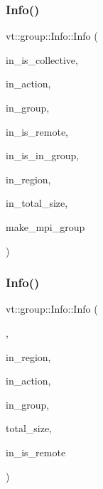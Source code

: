 \subsubsection{\texorpdfstring{Info()}{Info()}\hspace{0.1cm}{\footnotesize\ttfamily [1/5]}}
{\footnotesize\ttfamily vt\+::group\+::\+Info\+::\+Info (\begin{DoxyParamCaption}\item[{bool const \&}]{in\+\_\+is\+\_\+collective,  }\item[{\hyperlink{namespacevt_ae0a5a7b18cc99d7b732cb4d44f46b0f3}{Action\+Type}}]{in\+\_\+action,  }\item[{\hyperlink{namespacevt_a27b5e4411c9b6140c49100e050e2f743}{Group\+Type} const}]{in\+\_\+group,  }\item[{bool const \&}]{in\+\_\+is\+\_\+remote,  }\item[{bool const \&}]{in\+\_\+is\+\_\+in\+\_\+group,  }\item[{\hyperlink{structvt_1_1group_1_1_info_rooted_a127ac5ebcfb9871621c1f66dba481c0b}{Region\+Ptr\+Type}}]{in\+\_\+region,  }\item[{\hyperlink{structvt_1_1group_1_1region_1_1_region_a9bb381adf31111aae34dbc644bad6c1f}{Region\+Type\+::\+Size\+Type} const \&}]{in\+\_\+total\+\_\+size,  }\item[{bool}]{make\+\_\+mpi\+\_\+group }\end{DoxyParamCaption})\hspace{0.3cm}{\ttfamily [protected]}}

\mbox{\label{structvt_1_1group_1_1_info_a246c74e5238c8fc15d49c258bd25afd5}} 
\subsubsection{\texorpdfstring{Info()}{Info()}\hspace{0.1cm}{\footnotesize\ttfamily [2/5]}}
{\footnotesize\ttfamily vt\+::group\+::\+Info\+::\+Info (\begin{DoxyParamCaption}\item[{Info\+Rooted\+Cons\+Type}]{,  }\item[{\hyperlink{structvt_1_1group_1_1_info_rooted_a127ac5ebcfb9871621c1f66dba481c0b}{Region\+Ptr\+Type}}]{in\+\_\+region,  }\item[{\hyperlink{namespacevt_ae0a5a7b18cc99d7b732cb4d44f46b0f3}{Action\+Type}}]{in\+\_\+action,  }\item[{\hyperlink{namespacevt_a27b5e4411c9b6140c49100e050e2f743}{Group\+Type} const}]{in\+\_\+group,  }\item[{\hyperlink{structvt_1_1group_1_1region_1_1_region_a9bb381adf31111aae34dbc644bad6c1f}{Region\+Type\+::\+Size\+Type} const \&}]{total\+\_\+size,  }\item[{bool const \&}]{in\+\_\+is\+\_\+remote }\end{DoxyParamCaption})\hspace{0.3cm}{\ttfamily [protected]}}

